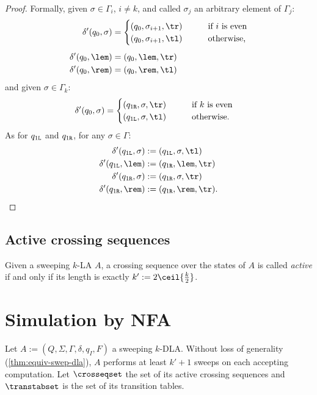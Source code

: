 \begin{proof}
	Formally, given $\sigma\in\Gamma_i$, $i\ne k$, and called $\sigma_j$ an arbitrary element of $\Gamma_j$:
	\begin{align*}
		\delta'(q_0,\sigma) & = \begin{cases}
			                        (q_0,\sigma_{i+1},\tr) \qquad & \text{if $i$ is even}   \\
			                        (q_0,\sigma_{i+1},\tl) \qquad & \text{otherwise} \text,
		                        \end{cases} \\[1ex]
		\delta'(q_0,\lem)   & = (q_0,\lem,\tr)                                          \\
		\delta'(q_0,\rem)   & = (q_0,\rem,\tl)
	\end{align*}
	and given $\sigma\in\Gamma_k$:
	\begin{align*}
		\delta'(q_0,\sigma) & = \begin{cases}
			                        (\qr,\sigma,\tr) \qquad & \text{if $k$ is even}   \\
			                        (\ql,\sigma,\tl) \qquad & \text{otherwise} \text.
		                        \end{cases}
	\end{align*}
	As for $q_{1\mathtt{L}}$ and $q_{1\mathtt{R}}$, for any $\sigma\in\Gamma$:
	\begin{align*}
		\delta'(\ql,\sigma) & :=(\ql,\sigma,\tl)               \\
		\delta'(\ql,\lem)   & :=(\qr,\lem,\tr)                 \\
		\delta'(\qr,\sigma) & :=(\qr,\sigma,\tr)               \\
		\delta'(\qr,\rem)   & :=(\qr,\rem,\tr) \text. \qedhere
	\end{align*}
\end{proof}


\subsection{Active crossing sequences}
\begin{defn}
	Given a sweeping $k$-LA $A$, a crossing sequence over the states of $A$ is called \emph{active} if and only if its length is exactly $k':=2\ceil{\frac{k}{2}}$.
\end{defn}


\section{Simulation by NFA}
Let $A:=(Q,\Sigma,\Gamma,\delta,q_I,F)$ a sweeping $k$-DLA.
Without loss of generality (\cref{thm:equiv-swep-dla}), $A$ performs at least $k'+1$ sweeps on each accepting computation.
Let $\crosseqset$ the set of its active crossing sequences and $\transtabset$ is the set of its transition tables.

